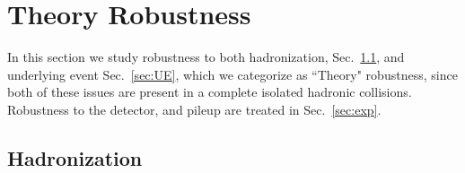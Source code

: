 \documentclass[11pt,letterpaper]{article}
\DeclareRobustCommand{\Sec}[1]{Sec.~\ref{#1}}
\begin{document}
\section{Theory Robustness}\label{sec:np}


In this section we study robustness to both hadronization, \Sec{sec:hadr}, and underlying event \Sec{sec:UE}, which we categorize as ``Theory" robustness, since both of these issues are present in a complete isolated hadronic collisions. Robustness to the detector, and pileup are treated in \Sec{sec:exp}. 



\subsection{Hadronization}\label{sec:hadr}





\begin{figure}
\begin{center}
\qquad
{}
\end{center}
\caption{ 
}
\label{fig:UE}
\end{figure}
\end{document}
